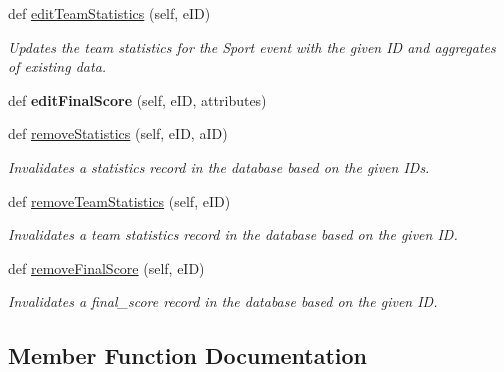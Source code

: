 \begin{DoxyCompactItemize}
def \hyperlink{classhandler_1_1event__result_1_1_event_result_handler_af65308627db8d6605a4b438ef4f75174}{edit\+Team\+Statistics} (self, e\+ID)
\begin{DoxyCompactList}\small\item\em Updates the team statistics for the Sport event with the given ID and aggregates of existing data. \end{DoxyCompactList}\item 
\mbox{\label{classhandler_1_1event__result_1_1_event_result_handler_af94a476f017668268ad9b6e550f9c944}} 
def {\bfseries edit\+Final\+Score} (self, e\+ID, attributes)
\item 
def \hyperlink{classhandler_1_1event__result_1_1_event_result_handler_a149d5152b04f09f3d37856befac27e59}{remove\+Statistics} (self, e\+ID, a\+ID)
\begin{DoxyCompactList}\small\item\em Invalidates a statistics record in the database based on the given I\+Ds. \end{DoxyCompactList}\item 
def \hyperlink{classhandler_1_1event__result_1_1_event_result_handler_a0b856e2602fd0c998b3229bd96950471}{remove\+Team\+Statistics} (self, e\+ID)
\begin{DoxyCompactList}\small\item\em Invalidates a team statistics record in the database based on the given ID. \end{DoxyCompactList}\item 
def \hyperlink{classhandler_1_1event__result_1_1_event_result_handler_afda5b5b489168c47bad1456bfdbf536c}{remove\+Final\+Score} (self, e\+ID)
\begin{DoxyCompactList}\small\item\em Invalidates a final\+\_\+score record in the database based on the given ID. \end{DoxyCompactList}\end{DoxyCompactItemize}


\subsection{Member Function Documentation}
\mbox{\label{classhandler_1_1event__result_1_1_event_result_handler_aacc53c193c50a5e313257cc6b8e35adb}} 
